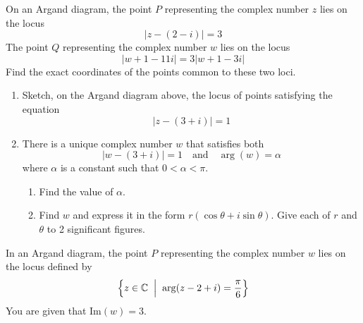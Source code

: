 \documentclass[leqno]{article}
\begin{document}
\begin{enumerate}[
  label=\textbf{\arabic*.},
  leftmargin=*,
  topsep=0pt,
  partopsep=0pt,
  parsep=0pt
]
\newpage

\questionitem

On an Argand diagram, the point $P$ representing the complex number $z$ lies on the locus
\[
\lvert z-(2-i)\rvert =3
\]
The point $Q$ representing the complex number $w$ lies on the locus
\[
\lvert w+1-11i\rvert =3\lvert w+1-3i\rvert
\]
Find the exact coordinates of the points common to these two loci. 

\newpage

\questionitem

\begin{figure}[H]
    \centering
{}
\end{figure}


\begin{enumerate}[label=\textbf{(\alph*)}]
  \item Sketch, on the Argand diagram above, the locus of points satisfying the equation
  \[
  |z-(3+i)|=1
  \]
  \item There is a unique complex number $w$ that satisfies both
  \[
  |w-(3+i)|=1 \quad \text{and} \quad \arg(w)=\alpha
  \]
  where $\alpha$ is a constant such that $0<\alpha<\pi$.
  \begin{enumerate}[label=(\roman*)]
    \item Find the value of $\alpha$. 
    \item Find $w$ and express it in the form $r(\cos\theta+i\sin\theta)$. Give each of $r$ and $\theta$ to 2 significant figures.  \\
  \end{enumerate}
\end{enumerate}

\newpage

\questionitem

In an Argand diagram, the point $P$ representing the complex number $w$ lies on the locus defined by \[\Bigl\{ z\in\mathbb{C}\;\Bigm|\; \arg(z-2+i)=\frac{\pi}{6} \Bigr\}\] You are given that $\mathrm{Im}(w)=3$. \\


\end{enumerate}
\end{document}
